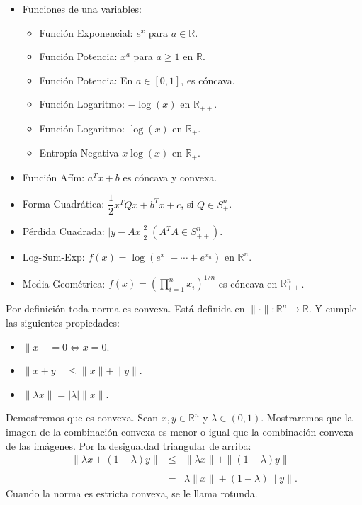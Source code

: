 \begin{paracol}{2}
\begin{ejem}
    \begin{itemize}
	\item Funciones de una variables:
	    \begin{itemize}
		\item Función Exponencial: $e^x$ para $a\in \mathbb{R}$.
		\item Función Potencia: $x^a$ para $a\geq 1$ en $\mathbb{R}$.
		\item Función Potencia: En $a\in [0,1]$, es cóncava.
		\item Función Logaritmo: $-\log(x)$ en $\mathbb{R}_{++}$.
		\item Función Logaritmo: $\log(x)$ en $\mathbb{R}_{+}$.
		\item Entropía Negativa $x\log(x)$ en $\mathbb{R}_{+}$.
	    \end{itemize}
	\item Función Afím: $a^Tx+b$ es cóncava y convexa.
	\item Forma Cuadrática: $\dfrac{1}{2}x^TQx+b^Tx+c$, si $Q\in S^n_+$.
	\item Pérdida Cuadrada: $|y-Ax|^2_2\; (A^TA\in S^n_{++})$.
	\item Log-Sum-Exp: $f(x)=\log\left(e^{x_1}+\cdots + e^{x_n}\right)$ en $\mathbb{R}^n$.
	\item Media Geométrica: $f(x)=\left(\displaystyle\prod_{i=1}^n x_i\right)^{1/n}$ es cóncava en $\mathbb{R}^n_{++}$.
    \end{itemize}
\end{ejem}

\begin{ejem}[Norma] Por definición toda norma es convexa. Está definida en $\|\cdot\|:\mathbb{R}^n \to \mathbb{R}$. Y cumple las siguientes propiedades:
    \begin{itemize}
	\item $\|x\|=0 \Leftrightarrow x=0$.
	\item $\|x+y\|\leq \|x\|+\|y\|$.
	\item $\|\lambda x\|=|\lambda|\|x\|$.
    \end{itemize}
    Demostremos que es convexa. Sean $x,y\in \mathbb{R}^n$ y $\lambda\in (0,1)$. Mostraremos que la imagen de la combinación convexa es menor o igual que la combinación convexa de las imágenes. Por la desigualdad triangular de arriba:
    $$
    \begin{array}{rcl}
	\|\lambda x+(1-\lambda)y\|&\leq& \|\lambda  x\|+\|(1-\lambda)y\|\\\\
				  &=&\lambda\|x\|+(1-\lambda)\|y\|.
    \end{array}
    $$
    Cuando la norma es estricta convexa, se le llama rotunda.
\end{ejem}




\end{paracol}
